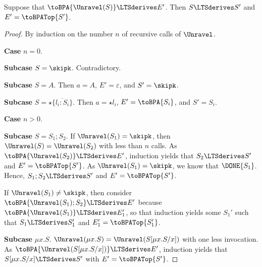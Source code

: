 \clearpage
\begin{lemma}\label{lemma:app:bpa-unr-s}
  Suppose that $\toBPA{\Unravel
    (S)} \LTSderives E'$. Then $S \LTSderives S'$
  and $E' = \toBPATop{S'}$.
\end{lemma}
\begin{proof}
  By induction on the number $n$ of recursive calls of $\Unravel$.

  \textbf{Case }$n=0$.

  \textbf{Subcase }$S=\skipk$. Contradictory.

  \textbf{Subcase }$S=A$. Then $a=A$, $E'=\varepsilon$, and $S' =
  \skipk$.

  \textbf{Subcase }$S = \star\{\overline{l_i:S_i}\}$. Then $a = \star
  l_i$, $E' = \toBPA{S_i}$, and $S' = S_i$.

  \textbf{Case }$n>0$.

  \textbf{Subcase }$S = S_1;S_2$.
  If $\Unravel (S_1) = \skipk$, then $\Unravel (S) = \Unravel
  (S_2)$ with less than $n$ calls. As $\toBPA{\Unravel (S_2)} \LTSderives E'$, induction yields
  that $S_2 \LTSderives S'$ and $E' = \toBPATop{S'}$.
  As $\Unravel (S_1) = \skipk$, we know that $\DONE{S_1}$. Hence,
  ${S_1;S_2} \LTSderives S'$ and $E' = \toBPATop{S'}$.

  If $\Unravel (S_1)\ne \skipk$, then consider $\toBPA{\Unravel({S_1});
    S_2} \LTSderives E'$ because $\toBPA{\Unravel({S_1})} \LTSderives
  E_1'$, so that induction yields some $S_1'$ such that $S_1
  \LTSderives S_1'$ and $E_1' = \toBPATop{S_1'}$.

  \textbf{Subcase }$\mu x.S$.
  $\Unravel (\mu x.S) = \Unravel (S[\mu x.S/x])$ with one less
  invocation. As $\toBPA{\Unravel (S[\mu x.S/x])}
  \LTSderives E'$, induction yields that  $S[\mu x.S/x] \LTSderives
  S'$ with $E' = \toBPATop{S'} $.
\end{proof}


